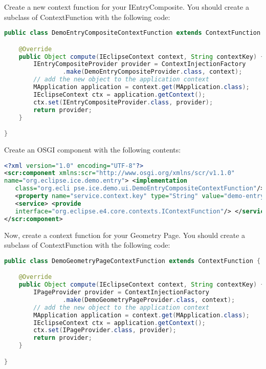 Create a new context function for your IEntryComposite. You should create a
subclass of ContextFunction with the following code:

\begin{lstlisting}[language=java]
public class DemoEntryCompositeContextFunction extends ContextFunction {

    @Override
    public Object compute(IEclipseContext context, String contextKey) {
        IEntryCompositeProvider provider = ContextInjectionFactory
                .make(DemoEntryCompositeProvider.class, context);
        // add the new object to the application context
        MApplication application = context.get(MApplication.class);
        IEclipseContext ctx = application.getContext();
        ctx.set(IEntryCompositeProvider.class, provider);
        return provider;
    }

}
\end{lstlisting}

Create an OSGI component with the following contents:

\begin{lstlisting}[language=xml]
<?xml version="1.0" encoding="UTF-8"?>
<scr:component xmlns:scr="http://www.osgi.org/xmlns/scr/v1.1.0"
name="org.eclipse.ice.demo.entry"> <implementation
   class="org.ecli pse.ice.demo.ui.DemoEntryCompositeContextFunction"/>
   <property name="service.context.key" type="String" value="demo-entry"/>
   <service> <provide
   interface="org.eclipse.e4.core.contexts.IContextFunction"/> </service>
</scr:component>
\end{lstlisting}

Now, create a context function for your Geometry Page. You should create a
subclass of ContextFunction with the following code:

\begin{lstlisting}[language=java]
public class DemoGeometryPageContextFunction extends ContextFunction {

    @Override
    public Object compute(IEclipseContext context, String contextKey) {
        IPageProvider provider = ContextInjectionFactory
                .make(DemoGeometryPageProvider.class, context);
        // add the new object to the application context
        MApplication application = context.get(MApplication.class);
        IEclipseContext ctx = application.getContext();
        ctx.set(IPageProvider.class, provider);
        return provider;
    }

}
\end{lstlisting}

